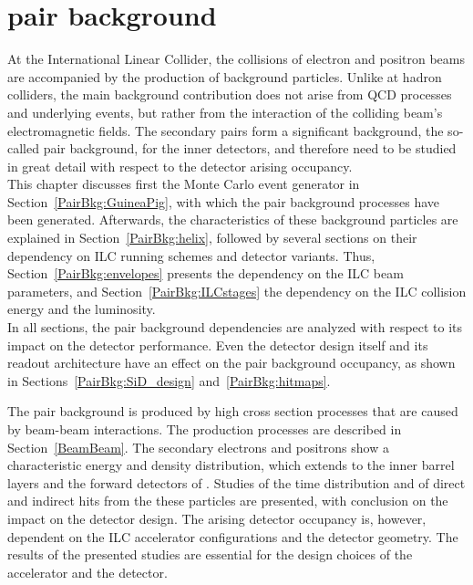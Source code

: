 \chapter{\texorpdfstring{\positron\electron pair background}{Electron-positron pair background}}
\label{PairBkg}

\begin{chapterabstract}
 At the International Linear Collider, the collisions of electron and positron beams are accompanied by the production of background particles.
 Unlike at hadron colliders, the main background contribution does not arise from QCD processes and underlying events, but rather from the interaction of the colliding beam's electromagnetic fields.
 The secondary \positron\electron pairs form a significant background, the so-called pair background, for the inner detectors, and therefore need to be studied in great detail with respect to the detector arising occupancy.
 \\This chapter discusses first the Monte Carlo event generator in Section~\ref{PairBkg:GuineaPig}, with which the pair background processes have been generated.
 Afterwards, the characteristics of these background particles are explained in Section~\ref{PairBkg:helix}, followed by several sections on their dependency on ILC running schemes and \sid detector variants.
 Thus, Section~\ref{PairBkg:envelopes} presents the dependency on the ILC beam parameters, and Section~\ref{PairBkg:ILCstages} the dependency on the ILC collision energy and the luminosity.
 \\In all sections, the pair background dependencies are analyzed with respect to its impact on the \sid detector performance.
 Even the detector design itself and its readout architecture have an effect on the pair background occupancy, as shown in Sections~\ref{PairBkg:SiD_design} and~\ref{PairBkg:hitmaps}.
\end{chapterabstract}
\vspace*{0.5cm}\newline
\noindent
The pair background is produced by high cross section processes that are caused by beam-beam interactions.
The production processes are described in Section~\ref{BeamBeam}.
The secondary electrons and positrons show a characteristic energy and density distribution, which extends to the inner barrel layers and the forward detectors of \sid.
Studies of the time distribution and of direct and indirect hits from the these particles are presented, with conclusion on the impact on the detector design.
The arising detector occupancy is, however, dependent on the ILC accelerator configurations and the detector geometry.
The results of the presented studies are essential for the design choices of the accelerator and the \sid detector.

